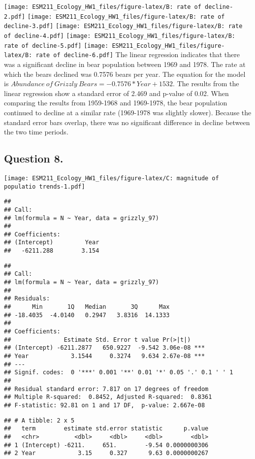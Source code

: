 \documentclass[]{article}
\begin{document}
\texttt{[image: ESM211\_Ecology\_HW1\_files/figure-latex/B: rate of decline-2.pdf]}
\texttt{[image: ESM211\_Ecology\_HW1\_files/figure-latex/B: rate of decline-3.pdf]}
\texttt{[image: ESM211\_Ecology\_HW1\_files/figure-latex/B: rate of decline-4.pdf]}
\texttt{[image: ESM211\_Ecology\_HW1\_files/figure-latex/B: rate of decline-5.pdf]}
\texttt{[image: ESM211\_Ecology\_HW1\_files/figure-latex/B: rate of decline-6.pdf]}
The linear regression indicates that there was a significant decline in
bear population between 1969 and 1978. The rate at which the bears
declined was 0.7576 bears per year. The equation for the model is
\(Abundance~of~Grizzly~Bears = -0.7576*Year + 1532\). The results from
the linear regression show a standard error of 2.469 and p-value of
0.02. When comparing the results from 1959-1968 and 1969-1978, the bear
population continued to decline at a similar rate (1969-1978 was
slightly slower). Because the standard error bars overlap, there was no
significant difference in decline between the two time periods.

\hypertarget{question-8.}{%
\subsection{Question 8.}\label{question-8.}}

\texttt{[image: ESM211\_Ecology\_HW1\_files/figure-latex/C: magnitude of populatio trends-1.pdf]}

\begin{verbatim}
## 
## Call:
## lm(formula = N ~ Year, data = grizzly_97)
## 
## Coefficients:
## (Intercept)         Year  
##   -6211.288        3.154
\end{verbatim}

\begin{verbatim}
## 
## Call:
## lm(formula = N ~ Year, data = grizzly_97)
## 
## Residuals:
##      Min       1Q   Median       3Q      Max 
## -18.4035  -4.0140   0.2947   3.8316  14.1333 
## 
## Coefficients:
##               Estimate Std. Error t value Pr(>|t|)    
## (Intercept) -6211.2877   650.9227  -9.542 3.06e-08 ***
## Year            3.1544     0.3274   9.634 2.67e-08 ***
## ---
## Signif. codes:  0 '***' 0.001 '**' 0.01 '*' 0.05 '.' 0.1 ' ' 1
## 
## Residual standard error: 7.817 on 17 degrees of freedom
## Multiple R-squared:  0.8452, Adjusted R-squared:  0.8361 
## F-statistic: 92.81 on 1 and 17 DF,  p-value: 2.667e-08
\end{verbatim}

\begin{verbatim}
## # A tibble: 2 x 5
##   term        estimate std.error statistic      p.value
##   <chr>          <dbl>     <dbl>     <dbl>        <dbl>
## 1 (Intercept) -6211.     651.        -9.54 0.0000000306
## 2 Year            3.15     0.327      9.63 0.0000000267
\end{verbatim}
\end{document}
